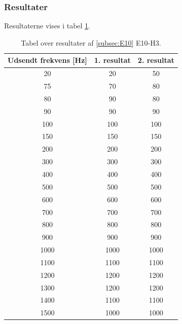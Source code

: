 		\subsubsection{Resultater}
		Resultaterne vises i tabel \ref{usbhojresul}. 
		\begin{table}[]
				\centering
				\caption{Tabel over resultater af \ref{subsec:E10} E10-H3.}
				\label{usbhojresul}
				\begin{tabular}{ccc}
					\multicolumn{1}{c|}{\textbf{Udsendt frekvens {[}Hz{]}}} & 	
					\multicolumn{1}{c|}{\textbf{1. resultat}} & \textbf{2. resultat} \\ \hline
					\multicolumn{1}{c|}{20}& 
					\multicolumn{1}{c|}{20}&50\\
					\multicolumn{1}{c|}{75}& 
					\multicolumn{1}{c|}{70}&80\\
					\multicolumn{1}{c|}{80}& 
					\multicolumn{1}{c|}{90}&80\\
					\multicolumn{1}{c|}{90}& 
					\multicolumn{1}{c|}{90}&90\\
					\multicolumn{1}{c|}{100}& 
					\multicolumn{1}{c|}{100}&100\\
					\multicolumn{1}{c|}{150}& 
					\multicolumn{1}{c|}{150}&150\\
					\multicolumn{1}{c|}{200}& 
					\multicolumn{1}{c|}{200}&200\\
					\multicolumn{1}{c|}{300}& 
					\multicolumn{1}{c|}{300}&300\\
					\multicolumn{1}{c|}{400}& 
					\multicolumn{1}{c|}{400}&400\\
					\multicolumn{1}{c|}{500}& 
					\multicolumn{1}{c|}{500}&500\\
					\multicolumn{1}{c|}{600}& 
					\multicolumn{1}{c|}{600}&600\\
					\multicolumn{1}{c|}{700}& 
					\multicolumn{1}{c|}{700}&700\\
					\multicolumn{1}{c|}{800}& 
					\multicolumn{1}{c|}{800}&800\\
					\multicolumn{1}{c|}{900}& 
					\multicolumn{1}{c|}{900}&900\\
					\multicolumn{1}{c|}{1000}& 
					\multicolumn{1}{c|}{1000}&1000\\
					\multicolumn{1}{c|}{1100}& 
					\multicolumn{1}{c|}{1100}&1100\\
					\multicolumn{1}{c|}{1200}& 
					\multicolumn{1}{c|}{1200}&1200\\
					\multicolumn{1}{c|}{1300}& 
					\multicolumn{1}{c|}{1200}&1200\\
					\multicolumn{1}{c|}{1400}& 
					\multicolumn{1}{c|}{1100}&1100\\
					\multicolumn{1}{c|}{1500}& 
					\multicolumn{1}{c|}{1000}&1000\\
                   \end{tabular}
			\end{table}
		

